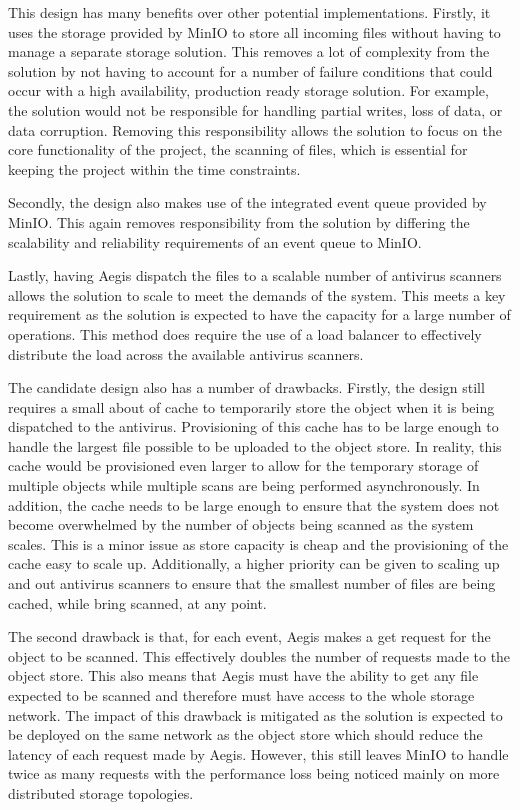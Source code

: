 \documentclass[12pt, conference, final, a4paper, onecolumn, compsoc]{IEEEtran}
\begin{document}
This design has many benefits over other potential implementations. Firstly, it
uses the storage provided by MinIO to store all incoming files without having to
manage a separate storage solution. This removes a lot of complexity from the
solution by not having to account for a number of failure conditions that could
occur with a high availability, production ready storage solution. For example,
the solution would not be responsible for handling partial writes, loss of data,
or data corruption. Removing this responsibility allows the solution to focus on
the core functionality of the project, the scanning of files, which is essential
for keeping the project within the time constraints.

Secondly, the design also makes use of the integrated event queue provided by
MinIO. This again removes responsibility from the solution by differing the
scalability and reliability requirements of an event queue to MinIO.

Lastly, having Aegis dispatch the files to a scalable number of antivirus
scanners allows the solution to scale to meet the demands of the system. This
meets a key requirement as the solution is expected to have the capacity for a
large number of operations. This method does require the use of a load balancer
to effectively distribute the load across the available antivirus scanners.

The candidate design also has a number of drawbacks. Firstly, the design still
requires a small about of cache to temporarily store the object when it is being
dispatched to the antivirus. Provisioning of this cache has to be large enough
to handle the largest file possible to be uploaded to the object store. In
reality, this cache would be provisioned even larger to allow for the temporary
storage of multiple objects while multiple scans are being performed
asynchronously. In addition, the cache needs to be large enough to ensure that
the system does not become overwhelmed by the number of objects being scanned as
the system scales. This is a minor issue as store capacity is cheap and the
provisioning of the cache easy to scale up. Additionally, a higher priority can
be given to scaling up and out antivirus scanners to ensure that the smallest
number of files are being cached, while bring scanned, at any point.


The second drawback is that, for each event, Aegis makes a get request for the
object to be scanned. This effectively doubles the number of requests made to
the object store. This also means that Aegis must have the ability to get any
file expected to be scanned and therefore must have access to the whole storage
network. The impact of this drawback is mitigated as the solution is expected to
be deployed on the same network as the object store which should reduce the
latency of each request made by Aegis. However, this still leaves MinIO to
handle twice as many requests with the performance loss being noticed mainly on
more distributed storage topologies.
\end{document}
